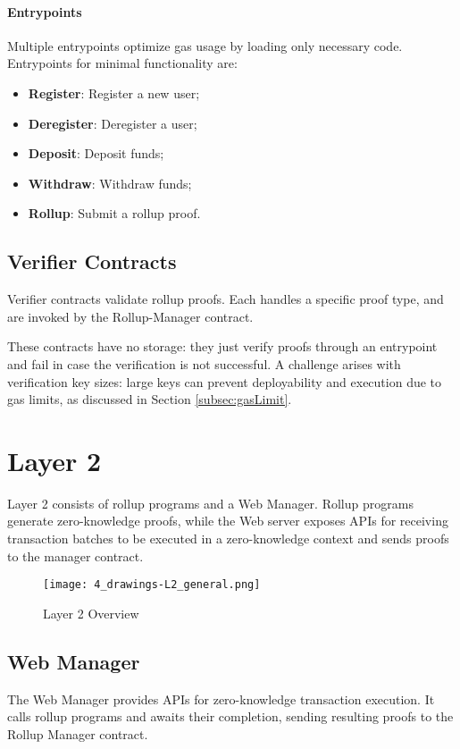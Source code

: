 \paragraph{Entrypoints}
Multiple entrypoints optimize gas usage by loading only necessary code. Entrypoints for minimal functionality are:
\begin{itemize}
  \item \textbf{Register}: Register a new user;
  \item \textbf{Deregister}: Deregister a user;
  \item \textbf{Deposit}: Deposit funds;
  \item \textbf{Withdraw}: Withdraw funds;
  \item \textbf{Rollup}: Submit a rollup proof.
\end{itemize}

\subsection{Verifier Contracts\label{sec:designverifiercontracts}}
Verifier contracts validate rollup proofs. Each handles a specific proof type, and are invoked by the Rollup-Manager contract.

These contracts have no storage: they just verify proofs through an entrypoint and fail in case the verification is not successful. A challenge arises with verification key sizes: large keys can prevent deployability and execution due to gas limits, as discussed in Section \ref{subsec:gasLimit}.

\section{Layer 2\label{sec:designLayer2}}
Layer 2 consists of rollup programs and a Web Manager. Rollup programs generate zero-knowledge proofs, while the Web server exposes APIs for receiving transaction batches to be executed in a zero-knowledge context and sends proofs to the manager contract.

\begin{figure}[htb]
  \centering
  \texttt{[image: 4\_drawings-L2\_general.png]}
  \caption{Layer 2 Overview}
  \label{fig:Layer2overview}
\end{figure}

\subsection{Web Manager\label{sec:designwebserver}}
The Web Manager provides APIs for zero-knowledge transaction execution. It calls rollup programs and awaits their completion, sending resulting proofs to the Rollup Manager contract.

